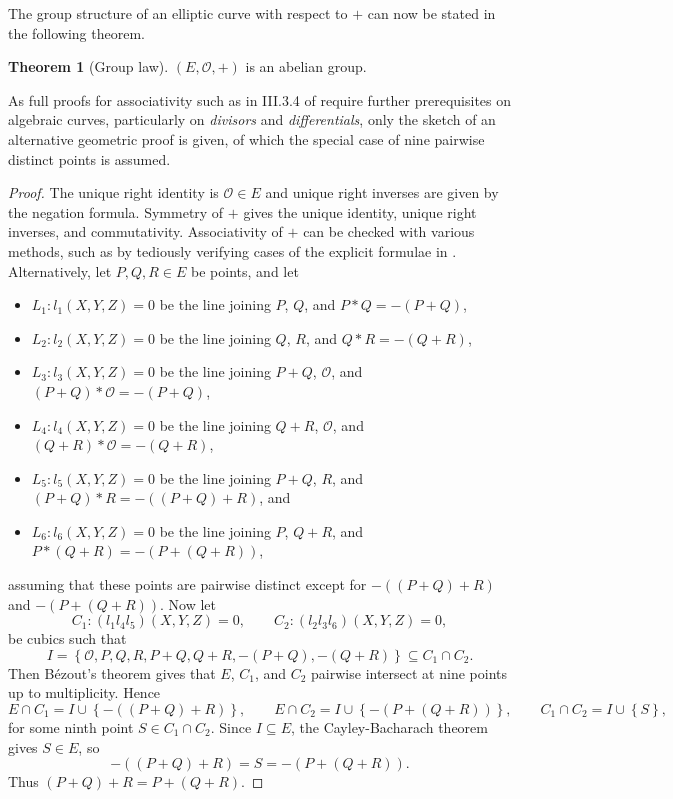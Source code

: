 \documentclass{article}
\newcommand{\rb}[1]{\left( #1 \right)}
\newcommand{\cb}[1]{\left\{ #1 \right\}}
\theoremstyle{definition}
\newtheorem{theorem}[proposition]{Theorem}
\begin{document}
\pagebreak

The group structure of an elliptic curve with respect to $ + $ can now be stated in the following theorem.

\begin{theorem}[Group law]
$ \rb{E, \mathcal{O}, +} $ is an abelian group.
\end{theorem}

As full proofs for associativity such as in III.3.4 of \cite{gtm} require further prerequisites on algebraic curves, particularly on \emph{divisors} and \emph{differentials}, only the sketch of an alternative geometric proof is given, of which the special case of nine pairwise distinct points is assumed.

\begin{proof}
The unique right identity is $ \mathcal{O} \in E $ and unique right inverses are given by the negation formula. Symmetry of $ + $ gives the unique identity, unique right inverses, and commutativity. Associativity of $ + $ can be checked with various methods, such as by tediously verifying cases of the explicit formulae in \cite{grouplaw}. Alternatively, let $ P, Q, R \in E $ be points, and let
\begin{itemize}
\item $ L_1 : l_1\rb{X, Y, Z} = 0 $ be the line joining $ P $, $ Q $, and $ P * Q = -\rb{P + Q} $,
\item $ L_2 : l_2\rb{X, Y, Z} = 0 $ be the line joining $ Q $, $ R $, and $ Q * R = -\rb{Q + R} $,
\item $ L_3 : l_3\rb{X, Y, Z} = 0 $ be the line joining $ P + Q $, $ \mathcal{O} $, and $ \rb{P + Q} * \mathcal{O} = -\rb{P + Q} $,
\item $ L_4 : l_4\rb{X, Y, Z} = 0 $ be the line joining $ Q + R $, $ \mathcal{O} $, and $ \rb{Q + R} * \mathcal{O} = -\rb{Q + R} $,
\item $ L_5 : l_5\rb{X, Y, Z} = 0 $ be the line joining $ P + Q $, $ R $, and $ \rb{P + Q} * R = -\rb{\rb{P + Q} + R} $, and
\item $ L_6 : l_6\rb{X, Y, Z} = 0 $ be the line joining $ P $, $ Q + R $, and $ P * \rb{Q + R} = -\rb{P + \rb{Q + R}} $,
\end{itemize}
assuming that these points are pairwise distinct except for $ -\rb{\rb{P + Q} + R} $ and $ -\rb{P + \rb{Q + R}} $. Now let
$$ C_1 : \rb{l_1l_4l_5}\rb{X, Y, Z} = 0, \qquad C_2 : \rb{l_2l_3l_6}\rb{X, Y, Z} = 0, $$
be cubics such that
$$ I = \cb{\mathcal{O}, P, Q, R, P + Q, Q + R, -\rb{P + Q}, -\rb{Q + R}} \subseteq C_1 \cap C_2. $$
Then B\'ezout's theorem gives that $ E $, $ C_1 $, and $ C_2 $ pairwise intersect at nine points up to multiplicity. Hence
$$ E \cap C_1 = I \cup \cb{-\rb{\rb{P + Q} + R}}, \qquad E \cap C_2 = I \cup \cb{-\rb{P + \rb{Q + R}}}, \qquad C_1 \cap C_2 = I \cup \cb{S}, $$
for some ninth point $ S \in C_1 \cap C_2 $. Since $ I \subseteq E $, the Cayley-Bacharach theorem gives $ S \in E $, so
$$ -\rb{\rb{P + Q} + R} = S = -\rb{P + \rb{Q + R}}. $$
Thus $ \rb{P + Q} + R = P + \rb{Q + R} $.
\end{proof}
\end{document}
